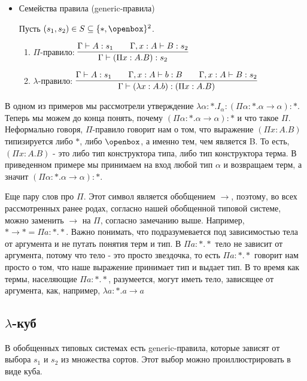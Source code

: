\begin{itemize}
\item Семейства правила (generic-правила)

Пусть $(s_1, s_2) \in S \subseteq \{*, \openbox\}^2$.

\begin{enumerate}
    \item $\Pi$-правило: $\vcenter{\infer[]{\Gamma \vdash (\Pi x : A.B) : s_2}{\Gamma \vdash A : s_1 \qquad \Gamma, x : A \vdash B : s_2}}$
    \item $\lambda$-правило: $\vcenter{\infer[]{\Gamma \vdash (\lambda x : A . b) : (\Pi x : A. B)}{\Gamma \vdash A:s_1 \qquad \Gamma, x : A \vdash b : B \qquad \Gamma, x : A \vdash B : s_2}}$
\end{enumerate}

\end{itemize}

В одном из примеров мы рассмотрели утверждение $\lambda \alpha : *.I_\alpha : (\Pi \alpha : * . \alpha \rightarrow \alpha):*$. Теперь мы можем до конца понять, почему $(\Pi \alpha : * . \alpha \rightarrow \alpha):*$ и что такое $\Pi$. Неформально говоря, $\Pi$-правило говорит нам о том, что выражение $(\Pi x : A.B)$ типизируется либо $*$, либо $\openbox$, а именно тем, чем является B. То есть, $(\Pi x : A.B)$ - это либо тип конструктора типа, либо тип конструктора терма. В приведенном примере мы принимаем на вход любой тип $\alpha$  и возвращаем терм, а значит $(\Pi \alpha : * . \alpha \rightarrow \alpha):*$.

Еще пару слов про $\Pi$. Этот символ является обобщением $\rightarrow$, поэтому, во всех рассмотренных ранее родах, согласно нашей обобщенной типовой системе, можно заменить $\rightarrow$ на $\Pi$, согласно замечанию выше. Например, $* \rightarrow * = \Pi a : *. *$. Важно понимать, что подразумевается под зависимостью тела от аргумента и не путать понятия терм и тип. В $\Pi a : *. *$ тело не зависит от аргумента, потому что тело - это просто звездочка, то есть  $\Pi a : *. *$ говорит нам просто о том, что наше выражение принимает тип и выдает тип. В то время как термы, населяющие $\Pi a : *. *$, разумеется, могут иметь тело, зависящее от аргумента, как, например, $\lambda a : *. a \rightarrow a$

\subsection{$\lambda$-куб}

В обобщенных типовых системах есть generic-правила, которые зависят от выбора $s_1$ и $s_2$ из множества сортов. Этот выбор можно проиллюстрировать в виде куба.


